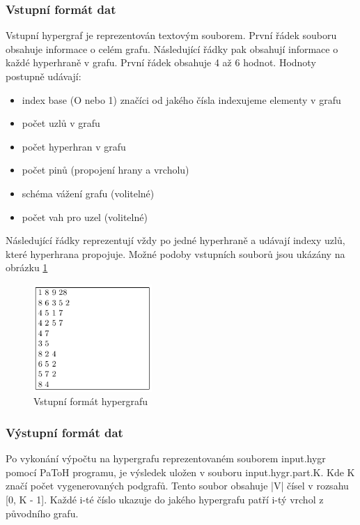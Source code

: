 \documentclass[thesis=M,czech]{FITthesis}[2012/06/26]
\begin{document}
\subsubsection{Vstupní formát dat}
Vstupní hypergraf je reprezentován textovým souborem. První řádek souboru obsahuje informace o celém grafu. Následující řádky pak obsahují informace o každé hyperhraně v grafu. První řádek obsahuje 4 až 6 hodnot. Hodnoty postupně udávají:
\begin{itemize}
\item index base (O nebo 1) značíci od jakého čísla indexujeme elementy v grafu
\item počet uzlů v grafu
\item počet hyperhran v grafu
\item počet pinů (propojení hrany a vrcholu)
\item schéma vážení grafu (volitelné)
\item počet vah pro uzel (volitelné)
\end{itemize}

Následující řádky reprezentují vždy po jedné hyperhraně a udávají indexy uzlů, které hyperhrana propojuje. Možné podoby vstupních souborů jsou ukázány na obrázku \ref{fig:input}

\begin{figure}\centering
	\includegraphics[width=0.4\textwidth, angle=0]{files/inputformat}
	\caption[Vstupní formát hypergrafu]
	{Vstupní formát hypergrafu}\label{fig:input}
\end{figure} 
\subsubsection{Výstupní formát dat}
Po vykonání výpočtu na hypergrafu reprezentovaném souborem input.hygr pomocí PaToH programu, je výsledek uložen v souboru input.hygr.part.K. Kde K značí počet vygenerovaných podgrafů. Tento soubor obsahuje |V| čísel v rozsahu [0, K - 1]. Každé i-té číslo ukazuje do jakého hypergrafu patří i-tý vrchol z původního grafu.
\end{document}
